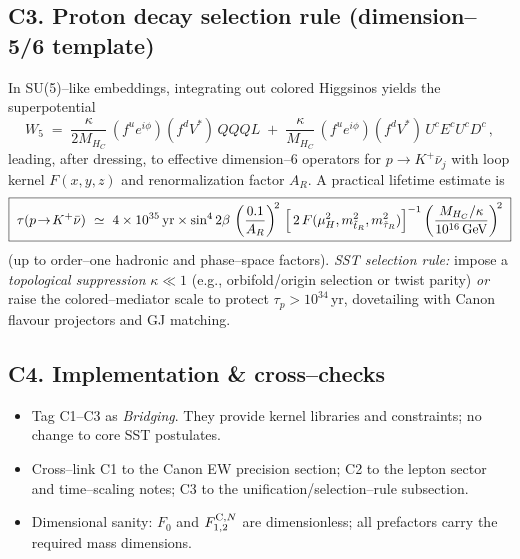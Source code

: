 \documentclass[11pt]{article}
\begin{document}
  \subsection*{C3. Proton decay selection rule (dimension--5/6 template)}
      In SU(5)--like embeddings, integrating out colored Higgsinos yields the superpotential
      \begin{equation}
      W_5 \;=\; \frac{\kappa}{2M_{H_C}}\,(f^u e^{i\phi})(f^d V^*)\,QQQL
      \;+\; \frac{\kappa}{M_{H_C}}\,(f^u e^{i\phi})(f^d V^*)\,U^c E^c U^c D^c \,,
      \end{equation}
      leading, after dressing, to effective dimension--6 operators for $p\to K^+\bar\nu_j$ with loop kernel $F(x,y,z)$ and renormalization factor $A_R$. A practical lifetime estimate is
      \begin{equation}
      \boxed{\;
      \tau(p\!\to\!K^+\bar\nu)\ \simeq\
          4\times 10^{35}\,\text{yr}\times
          \sin^4 2\beta\,
          \left(\frac{0.1}{A_R}\right)^{\!2}\,
          \Bigl[\,2\,F(\mu_H^2, m_{\tilde t_R}^2, m_{\tilde\tau_R}^2)\Bigr]^{-1}
          \left(\frac{M_{H_C}/\kappa}{10^{16}\,\text{GeV}}\right)^{\!2}
          \;}
      \end{equation}
      (up to order--one hadronic and phase--space factors).
      \textit{SST selection rule:} impose a \emph{topological suppression} $\kappa\ll1$ (e.g., orbifold/origin selection or twist parity) \emph{or} raise the colored--mediator scale to protect $\tau_p>10^{34}\,$yr, dovetailing with Canon flavour projectors and GJ matching.

  \subsection*{C4. Implementation \& cross--checks}
      \begin{itemize}
      \item Tag C1--C3 as \emph{Bridging}. They provide kernel libraries and constraints; no change to core SST postulates.
      \item Cross--link C1 to the Canon EW precision section; C2 to the lepton sector and time--scaling notes; C3 to the unification/selection--rule subsection.
      \item Dimensional sanity: $F_0$ and $F^{\textrm C,N}_{1,2}$ are dimensionless; all prefactors carry the required mass dimensions.
      \end{itemize}
\end{document}
